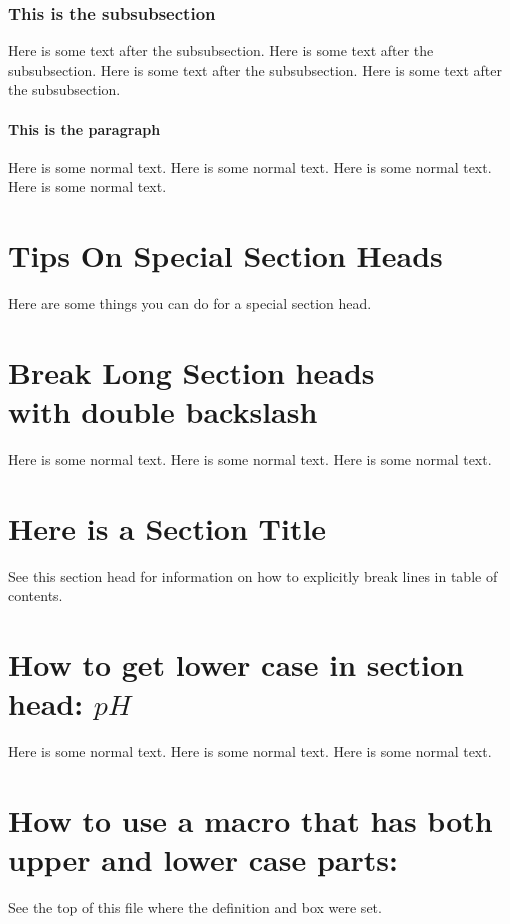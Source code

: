 \documentclass{wileySix}
\begin{document}
\subsubsection{This is the subsubsection}
Here is some text after the subsubsection.
Here is some text after the subsubsection.
Here is some text after the subsubsection.
Here is some text after the subsubsection.

\paragraph{This is the paragraph}
Here is some normal text.
Here is some normal text.
Here is some normal text.
Here is some normal text.

\section{Tips On Special Section Heads}
Here are some things you can do for a special
section head.

\section[This Version of Section Head will be sent Contents]
{Break Long Section heads\\ with double backslash}
Here is some normal text.
Here is some normal text.
Here is some normal text.

 \section[This show how to explicitly break lines
\string\hfill\string\break\space in Table of Contents]
{Here is a Section Title}
See this section head for information on how to explicitly break lines in
table of contents.

\section{How to get \lowercase{lower case} in section head: \lowercase{$p$}$H$}
Here is some normal text.
Here is some normal text.
Here is some normal text.

\section{How to use a macro that has both upper and lower case parts:
\copy\sectsavebox}
See the top of this file where the definition and box were set.
\end{document}
